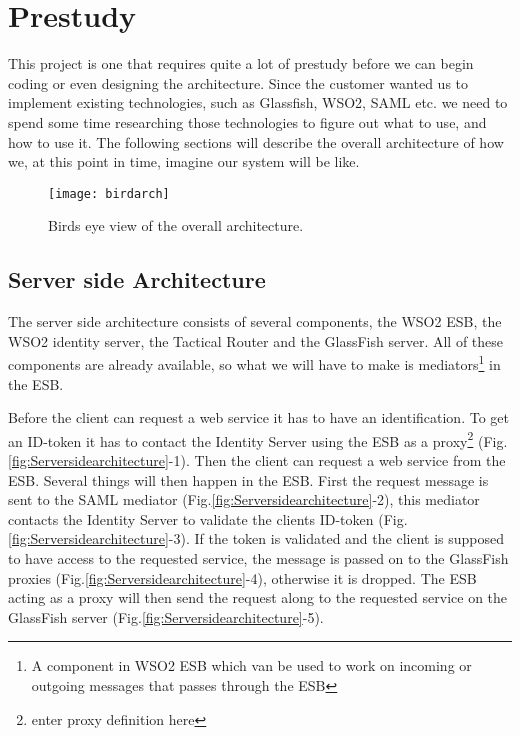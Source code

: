 \section{Prestudy}\label{Prestudy} This project is one that requires quite a lot of prestudy before we can begin coding or even designing the architecture. Since the customer wanted us to implement existing technologies, such as Glassfish, WSO2, SAML etc. we need to spend some time researching those technologies to figure out what to use, and how to use it. The following sections will describe the overall architecture of how we, at this point in time, imagine our system will be like. 

        \begin{figure}[htb]
            \centering
            \texttt{[image: birdarch]}
            \caption{Birds eye view of the overall architecture.}
            \label{fig:birdarch}
        \end{figure}

    \subsection{Server side Architecture}\label{Server side Architecture}
    
        The server side architecture consists of several components, the WSO2 ESB, the WSO2 \gls{identity server}, the Tactical Router and the GlassFish server. All of these components are already available, so what we will have to make is \glspl{mediator}\footnote{A component in WSO2 ESB which van be used to work on incoming or outgoing messages that passes through the ESB} in the ESB.

        Before the client can request a web service it has to have an identification. To get an ID-\gls{token} it has to contact the Identity Server using the ESB as a \gls{proxy}\footnote{enter proxy definition here} (Fig.\ref{fig:Serversidearchitecture}-1). Then the client can request a web service from the ESB. Several things will then happen in the ESB. First the request message is sent to the SAML mediator (Fig.\ref{fig:Serversidearchitecture}-2), this mediator contacts the Identity Server to validate the clients ID-token (Fig.\ref{fig:Serversidearchitecture}-3). If the token is validated and the client is supposed to have access to the requested service, the message is passed on to the GlassFish proxies (Fig.\ref{fig:Serversidearchitecture}-4), otherwise it is dropped. The ESB acting as a proxy will then send the request along to the requested service on the GlassFish server (Fig.\ref{fig:Serversidearchitecture}-5).

